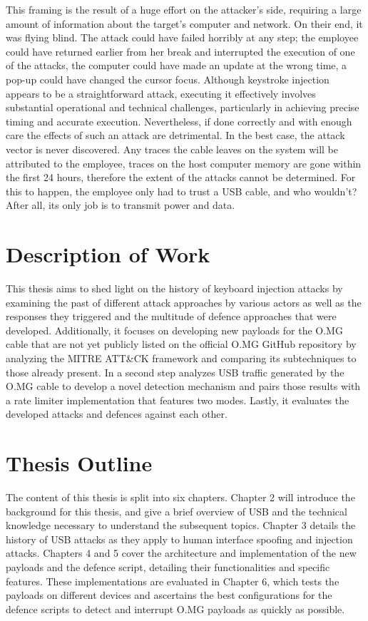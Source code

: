 This framing is the result of a huge effort on the attacker's side, requiring a large amount of information about the target's computer and network. On their end, it was flying blind. The attack could have failed horribly at any step; the employee could have returned earlier from her break and interrupted the execution of one of the attacks, the computer could have made an update at the wrong time, a pop-up could have changed the cursor focus. Although keystroke injection appears to be a straightforward attack, executing it effectively involves substantial operational and technical challenges, particularly in achieving precise timing and accurate execution. Nevertheless, if done correctly and with enough care the effects of such an attack are detrimental. In the best case, the attack vector is never discovered. Any traces the cable leaves on the system will be attributed to the employee, traces on the host computer memory are gone within the first 24 hours, therefore the extent of the attacks cannot be determined. For this to happen, the employee only had to trust a USB cable, and who wouldn't? After all, its only job is to transmit power and data. 



\section{Description of Work}

This thesis aims to shed light on the history of keyboard injection attacks by examining the past of different attack approaches by various actors as well as the responses they triggered and the multitude of defence approaches that were developed. Additionally, it focuses on developing new payloads for the O.MG cable that are not yet publicly listed on the official O.MG GitHub repository by analyzing the MITRE ATT\&CK framework and comparing its subtechniques to those already present. In a second step analyzes USB traffic generated by the O.MG cable to develop a novel detection mechanism and pairs those results with a rate limiter implementation that features two modes. Lastly, it evaluates the developed attacks and defences against each other.

\section{Thesis Outline}
The content of this thesis is split into six chapters. Chapter 2 will introduce the background for this thesis, and give a brief overview of USB and the technical knowledge necessary to understand the subsequent topics. Chapter 3 details the history of USB attacks as they apply to human interface spoofing and injection attacks. Chapters 4 and 5 cover the architecture and implementation of the new payloads and the defence script, detailing their functionalities and specific features. These implementations are evaluated in Chapter 6, which tests the payloads on different devices and ascertains the best configurations for the defence scripts to detect and interrupt O.MG payloads as quickly as possible.

